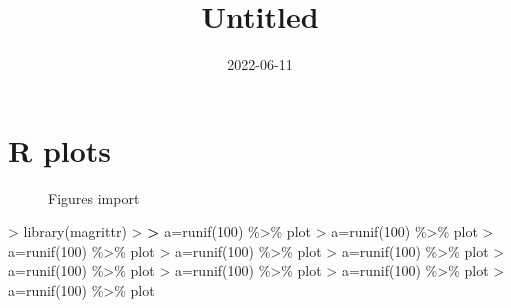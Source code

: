 \documentclass[
]{article}
\title{Untitled}
\author{}
\date{\vspace{-2.5em}2022-06-11}
\newenvironment{Shaded}{\begin{snugshade}}{\end{snugshade}}
\newcommand{\DecValTok}[1]{\textcolor[rgb]{0.00,0.00,0.81}{#1}}
\newcommand{\ErrorTok}[1]{\textcolor[rgb]{0.64,0.00,0.00}{\textbf{#1}}}
\newcommand{\FunctionTok}[1]{\textcolor[rgb]{0.00,0.00,0.00}{#1}}
\newcommand{\NormalTok}[1]{#1}
\newcommand{\OtherTok}[1]{\textcolor[rgb]{0.56,0.35,0.01}{#1}}
\newcommand{\SpecialCharTok}[1]{\textcolor[rgb]{0.00,0.00,0.00}{#1}}
\begin{document}
\maketitle

{
\setcounter{tocdepth}{2}
\tableofcontents
}
\hypertarget{r-plots}{%
\section{R plots}\label{r-plots}}

\begin{figure}[H]

{\centering {}

}

\caption{Figures import}\label{fig:saniya}
\end{figure}

\begin{Shaded}
\begin{Highlighting}[]
\SpecialCharTok{\textgreater{}} \FunctionTok{library}\NormalTok{(magrittr)}
\SpecialCharTok{\textgreater{}} 
\ErrorTok{\textgreater{}}\NormalTok{ a}\OtherTok{=}\FunctionTok{runif}\NormalTok{(}\DecValTok{100}\NormalTok{) }\SpecialCharTok{\%\textgreater{}\%}\NormalTok{ plot}
\SpecialCharTok{\textgreater{}}\NormalTok{ a}\OtherTok{=}\FunctionTok{runif}\NormalTok{(}\DecValTok{100}\NormalTok{) }\SpecialCharTok{\%\textgreater{}\%}\NormalTok{ plot}
\SpecialCharTok{\textgreater{}}\NormalTok{ a}\OtherTok{=}\FunctionTok{runif}\NormalTok{(}\DecValTok{100}\NormalTok{) }\SpecialCharTok{\%\textgreater{}\%}\NormalTok{ plot}
\SpecialCharTok{\textgreater{}}\NormalTok{ a}\OtherTok{=}\FunctionTok{runif}\NormalTok{(}\DecValTok{100}\NormalTok{) }\SpecialCharTok{\%\textgreater{}\%}\NormalTok{ plot}
\SpecialCharTok{\textgreater{}}\NormalTok{ a}\OtherTok{=}\FunctionTok{runif}\NormalTok{(}\DecValTok{100}\NormalTok{) }\SpecialCharTok{\%\textgreater{}\%}\NormalTok{ plot}
\SpecialCharTok{\textgreater{}}\NormalTok{ a}\OtherTok{=}\FunctionTok{runif}\NormalTok{(}\DecValTok{100}\NormalTok{) }\SpecialCharTok{\%\textgreater{}\%}\NormalTok{ plot}
\SpecialCharTok{\textgreater{}}\NormalTok{ a}\OtherTok{=}\FunctionTok{runif}\NormalTok{(}\DecValTok{100}\NormalTok{) }\SpecialCharTok{\%\textgreater{}\%}\NormalTok{ plot}
\SpecialCharTok{\textgreater{}}\NormalTok{ a}\OtherTok{=}\FunctionTok{runif}\NormalTok{(}\DecValTok{100}\NormalTok{) }\SpecialCharTok{\%\textgreater{}\%}\NormalTok{ plot}
\SpecialCharTok{\textgreater{}}\NormalTok{ a}\OtherTok{=}\FunctionTok{runif}\NormalTok{(}\DecValTok{100}\NormalTok{) }\SpecialCharTok{\%\textgreater{}\%}\NormalTok{ plot}
\end{Highlighting}
\end{Shaded}
\end{document}
